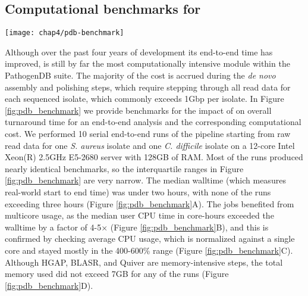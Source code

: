 \subsection{Computational benchmarks for \pathogendbpipeline}

\begin{figure*}[htb]
  \texttt{[image: chap4/pdb-benchmark]}               
  \caption[Boxplots of computational benchmarks for \pathogendbpipeline]{\textbf{Boxplots of computational benchmarks for \pathogendbpipeline{} on a \emph{S. aureus} and a \emph{C. difficile} isolate.} For each isolate, measurements were collected from 10 end-to-end serial runs of the pipeline, starting at raw read data and ending at the \texttt{prokka\textunderscore to\textunderscore igb} task, using a single server with a 12-core Intel Xeon(R) 2.5GHz E5-2680 CPU and 128GB of RAM.}
  \label{fig:pdb_benchmark}
\end{figure*}

Although over the past four years of development its end-to-end time has improved, \pathogendbpipeline{} is still by far the most computationally intensive module within the PathogenDB suite. The majority of the cost is accrued during the \emph{de novo} assembly and polishing steps, which require stepping through all read data for each sequenced isolate, which commonly exceeds 1Gbp per isolate. In Figure \ref{fig:pdb_benchmark} we provide benchmarks for the impact of \pathogendbpipeline{} on overall turnaround time for an end-to-end analysis and the corresponding computational cost. We performed 10 serial end-to-end runs of the pipeline starting from raw read data for one \emph{S. aureus} isolate and one \emph{C. difficile} isolate on a 12-core Intel Xeon(R) 2.5GHz E5-2680 server with 128GB of RAM. Most of the runs produced nearly identical benchmarks, so the interquartile ranges in Figure \ref{fig:pdb_benchmark} are very narrow. The median walltime (which measures real-world start to end time) was under two hours, with none of the runs exceeding three hours (Figure \ref{fig:pdb_benchmark}A). The jobs benefited from multicore usage, as the median user CPU time in core-hours exceeded the walltime by a factor of 4-5× (Figure \ref{fig:pdb_benchmark}B), and this is confirmed by checking average CPU usage, which is normalized against a single core and stayed mostly in the 400-600\% range (Figure \ref{fig:pdb_benchmark}C). Although HGAP, BLASR, and Quiver are memory-intensive steps, the total memory used did not exceed 7GB for any of the runs (Figure \ref{fig:pdb_benchmark}D).


